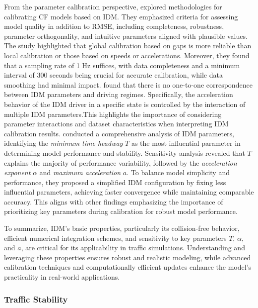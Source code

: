 \documentclass[a4paper,fleqn]{cas-sc}
\begin{document}
From the parameter calibration perspective, \cite{treiberMicroscopicCalibrationValidationCarFollowing2013} explored methodologies for calibrating CF models based on IDM. They emphasized criteria for assessing model quality in addition to RMSE, including completeness, robustness, parameter orthogonality, and intuitive parameters aligned with plausible values. The study highlighted that global calibration based on gaps is more reliable than local calibration or those based on speeds or accelerations. Moreover, they found that a sampling rate of 1 Hz suffices, with data completeness and a minimum interval of 300 seconds being crucial for accurate calibration, while data smoothing had minimal impact. \cite{sharmaMoreAlwaysBetterImpact2019b} found that there is no one-to-one correspondence between IDM parameters and driving regimes. Specifically, the acceleration behavior of the IDM driver in a specific state is controlled by the interaction of multiple IDM parameters.This highlights the importance of considering parameter interactions and dataset characteristics when interpreting IDM calibration results. \cite{punzo_we_2015} conducted a comprehensive analysis of IDM parameters, identifying the \textit{minimum time headway} $T$ as the most influential parameter in determining model performance and stability. Sensitivity analysis revealed that $T$ explains the majority of performance variability, followed by the \textit{acceleration exponent} $\alpha$ and \textit{maximum acceleration} $a$. To balance model simplicity and performance, they proposed a simplified IDM configuration by fixing less influential parameters, achieving faster convergence while maintaining comparable accuracy. This aligns with other findings emphasizing the importance of prioritizing key parameters during calibration for robust model performance.

To summarize, IDM's basic properties, particularly its collision-free behavior, efficient numerical integration schemes, and sensitivity to key parameters $T$, $\alpha$, and $a$, are critical for its applicability in traffic simulations. Understanding and leveraging these properties ensures robust and realistic modeling, while advanced calibration techniques and computationally efficient updates enhance the model’s practicality in real-world applications.


\subsubsection{Traffic Stability}
\end{document}
